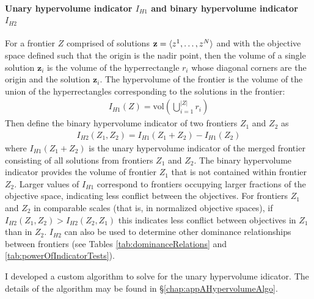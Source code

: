\paragraph{Unary hypervolume indicator $I_{H1}$ and binary hypervolume indicator $I_{H2}$}
For a frontier $Z$ comprised of solutions $\mathbf{z}=\braket{z^1,\ldots,z^N}$ and with the objective space defined such that the origin is the nadir point, then the volume of a single solution $\mathbf{z}_i$ is the volume of the hyperrectangle $r_i$ whose diagonal corners are the origin and the solution $\mathbf{z}_i$. The hypervolume of the frontier is the volume of the union of the hyperrectangles corresponding to the solutions in the frontier:
\begin{align}
I_{H1} (Z) = \text{vol} \left( \bigcup_{i = 1}^{|Z|} r_i \right)
\end{align}
Then define the binary hypervolume indicator of two frontiers $Z_1$ and $Z_2$ as \cite{zitzler1999evolutionary}
\begin{align}
I_{H2} (Z_1,Z_2) = I_{H1} (Z_1 + Z_2) - I_{H1} (Z_2)
\end{align}
where $I_{H1} (Z_1 + Z_2)$ is the unary hypervolume indicator of the merged frontier consisting of all solutions from frontiers $Z_1$ and $Z_2$. The binary hypervolume indicator provides the volume of frontier $Z_1$ that is not contained within frontier $Z_2$. Larger values of $I_{H1}$ correspond to frontiers occupying larger fractions of the objective space, indicating less conflict between the objectives. For frontiers $Z_1$ and $Z_2$ in comparable scales (that is, in normalized objective spaces), if $I_{H2}(Z_1, Z_2) > I_{H2}(Z_2, Z_1)$ this indicates less conflict between objectives in $Z_1$ than in $Z_2$. $I_{H2}$ can also be used to determine other dominance relationships between frontiers (see Tables \ref{tab:dominanceRelations} and \ref{tab:powerOfIndicatorTests}).


I developed a custom algorithm to solve for the unary hypervolume idicator. The details of the algorithm may be found in \S \ref{chap:appAHypervolumeAlgo}.


